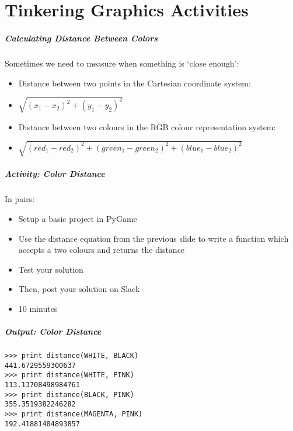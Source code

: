 \part{Tinkering Graphics Activities}
\frame{\partpage}

\begin{frame}
	\frametitle{Calculating Distance Between Colors}
	
	Sometimes we need to measure when something is `close enough':
	
	\begin{itemize}		
		\item Distance between two points in the Cartesian coordinate system:
		\item $\sqrt{(x_{1} - x_{2})^2 + (y_{1} - y_{2})^2}$
		\item Distance between two colours in the RGB colour representation system:
		\item $\sqrt{(red_{1} - red_{2})^2 + (green_{1} - green_{2})^2 + (blue_{1} - blue_{2})^2}$
	\end{itemize}
\end{frame}

\begin{frame}
	\frametitle{Activity: Color Distance}
	
	In pairs:
	
	\vspace{2em}
	
	\begin{itemize}		
		\item Setup a basic project in PyGame
		\item Use the distance equation from the previous slide to write a function which accepts a two colours and returns the distance
		\item Test your solution
		\item Then, post your solution on Slack
		\item 10 minutes
	\end{itemize}
\end{frame}

\begin{frame}[fragile]
	\frametitle{Output: Color Distance}
	
\begin{lstlisting}
>>> print distance(WHITE, BLACK)
441.6729559300637
>>> print distance(WHITE, PINK)
113.13708498984761
>>> print distance(BLACK, PINK)
355.3519382246282
>>> print distance(MAGENTA, PINK)
192.41881404893857
\end{lstlisting}

\end{frame}

